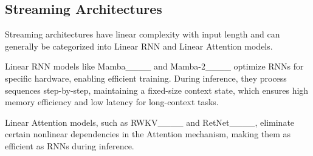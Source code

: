 \subsection{Streaming Architectures}
Streaming architectures have linear complexity with input length and can generally be categorized into Linear RNN and Linear Attention models.

Linear RNN models like Mamba____ and Mamba-2____ optimize RNNs for specific hardware, enabling efficient training.
During inference, they process sequences step-by-step, maintaining a fixed-size context state, which ensures high memory efficiency and low latency for long-context tasks.

Linear Attention models, such as RWKV____ and RetNet____, eliminate certain nonlinear dependencies in the Attention mechanism, making them as efficient as RNNs during inference.